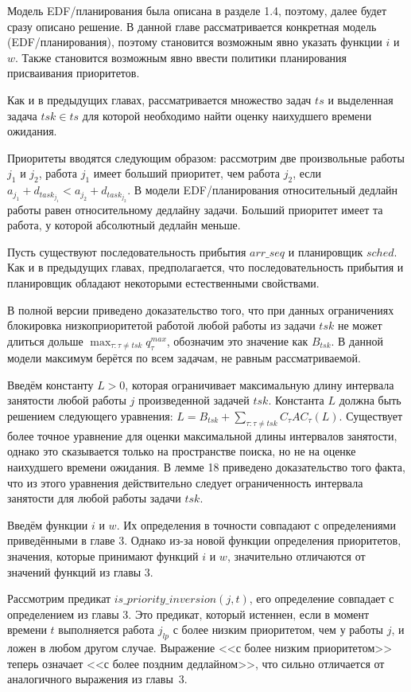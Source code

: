 Модель EDF\-/планирования была описана в разделе 1.4, поэтому, далее будет сразу описано
  решение. В данной главе рассматривается конкретная модель (EDF\-/планирования), поэтому
  становится возможным явно указать функции $i$ и $w$. Также становится возможным явно
  ввести политики планирования присваивания приоритетов.

Как и в предыдущих главах, рассматривается множество задач $ts$ и
 выделенная задача $tsk \in ts$ для которой необходимо найти оценку
 наихудшего времени ожидания.

Приоритеты вводятся следующим образом: рассмотрим две произвольные работы
  $j_1$ и $j_2$, работа $j_1$ имеет больший приоритет, чем работа $j_2$,
  если $a_{j_1} + d_{task_{j_1}} < a_{j_2} + d_{task_{j_2}}$. В модели EDF\-/планирования
  относительный дедлайн работы равен относительному дедлайну задачи. Больший
  приоритет имеет та работа, у которой абсолютный дедлайн меньше.

Пусть существуют последовательность прибытия $arr\_seq$ и планировщик $sched$.
  Как и в предыдущих главах, предполагается, что последовательность прибытия и планировщик
  обладают некоторыми естественными свойствами.

В полной версии приведено доказательство того, что при данных ограничениях
  блокировка низкоприоритетой работой любой работы
  из задачи $tsk$ не может длиться дольше $\max_{\tau: \tau \neq tsk} q_{\tau}^{max}$,
  обозначим это значение как $B_{tsk}$. В данной модели максимум берётся по всем задачам,
  не равным рассматриваемой.

Введём константу $L > 0$, которая ограничивает максимальную длину интервала занятости
  любой работы $j$ произведенной задачей $tsk$. Константа $L$ должна быть решением
  следующего уравнения: $L = B_{tsk} + \sum_{\tau: \tau \neq tsk} C_{\tau}AC_{\tau}(L)$.
  Существует более точное уравнение для оценки максимальной длины интервалов занятости, однако
  это сказывается только на пространстве поиска, но не на оценке наихудшего времени ожидания.
  В лемме 18 приведено доказательство того факта, что из этого уравнения действительно следует
  ограниченность интервала занятости для любой работы задачи $tsk$.

Введём функции $i$ и $w$. Их определения
  в точности совпадают с определениями приведёнными в главе 3. Однако из-за
  новой функции определения приоритетов, значения, которые принимают
  функций $i$ и $w$, значительно отличаются от значений функций из главы 3.

Рассмотрим предикат $is\_priority\_inversion(j, t)$, его определение совпадает с определением
  из главы 3. Это предикат, который истеннен, если в момент времени $t$ выполняется
  работа $j_{lp}$ с более низким приоритетом, чем у работы $j$, и ложен в любом другом случае.
  Выражение <<с более низким приоритетом>> теперь означает <<с более поздним дедлайном>>,
  что сильно отличается от аналогичного выражения из главы~3.

